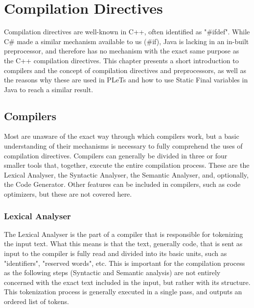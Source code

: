 \chapter{Compilation Directives}
\label{ch:staticfinal}

Compilation directives are well-known in C++, often identified as "\#ifdef". While C\# made a similar mechanism available to us (\#if), Java is lacking in an in-built preprocessor, and therefore has no mechanism with the exact same purpose as the C++ compilation directives. This chapter presents a short introduction to compilers and the concept of compilation directives and preprocessors, as well as the reasons why these are used in PLeTs and how to use Static Final variables in Java to reach a similar result.


\section{Compilers}

Most are unaware of the exact way through which compilers work, but a basic understanding of their mechanisms is necessary to fully comprehend the uses of compilation directives. Compilers can generally be divided in three or four smaller tools that, together, execute the entire compilation process. These are the Lexical Analyser, the Syntactic Analyser, the Semantic Analyser, and, optionally, the Code Generator. Other features can be included in compilers, such as code optimizers, but these are not covered here.


\subsection{Lexical Analyser}

The Lexical Analyser is the part of a compiler that is responsible for tokenizing the input text. What this means is that the text, generally code, that is sent as input to the compiler is fully read and divided into its basic units, such as "identifiers", "reserved words", etc. This is important for the compilation process as the following steps (Syntactic and Semantic analysis) are not entirely concerned with the exact text included in the input, but rather with its structure. This tokenization process is generally executed in a single pass, and outputs an ordered list of tokens.

